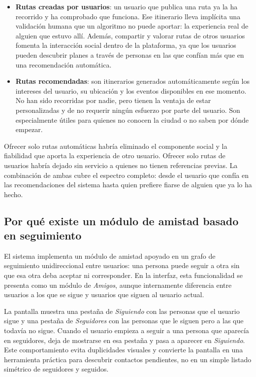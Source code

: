 \begin{itemize}
    \item \textbf{Rutas creadas por usuarios}: un usuario que publica una ruta ya la ha recorrido y ha comprobado que funciona. Ese itinerario lleva implícita una validación humana que un algoritmo no puede aportar: la experiencia real de alguien que estuvo allí. Además, compartir y valorar rutas de otros usuarios fomenta la interacción social dentro de la plataforma, ya que los usuarios pueden descubrir planes a través de personas en las que confían más que en una recomendación automática.
    \item \textbf{Rutas recomendadas}: son itinerarios generados automáticamente según los intereses del usuario, su ubicación y los eventos disponibles en ese momento. No han sido recorridas por nadie, pero tienen la ventaja de estar personalizadas y de no requerir ningún esfuerzo por parte del usuario. Son especialmente útiles para quienes no conocen la ciudad o no saben por dónde empezar.
\end{itemize}

Ofrecer solo rutas automáticas habría eliminado el componente social y la fiabilidad que aporta la experiencia de otro usuario. Ofrecer solo rutas de usuarios habría dejado sin servicio a quienes no tienen referencias previas. La combinación de ambas cubre el espectro completo: desde el usuario que confía en las recomendaciones del sistema hasta quien prefiere fiarse de alguien que ya lo ha hecho.

\subsection{Por qué existe un módulo de amistad basado en seguimiento}

El sistema implementa un módulo de amistad apoyado en un grafo de seguimiento unidireccional entre usuarios: una persona puede seguir a otra sin que esa otra deba aceptar ni corresponder. En la interfaz, esta funcionalidad se presenta como un módulo de \textit{Amigos}, aunque internamente diferencia entre usuarios a los que se sigue y usuarios que siguen al usuario actual.

La pantalla muestra una pestaña de \textit{Siguiendo} con las personas que el usuario sigue y una pestaña de \textit{Seguidores} con las personas que le siguen pero a las que todavía no sigue. Cuando el usuario empieza a seguir a una persona que aparecía en seguidores, deja de mostrarse en esa pestaña y pasa a aparecer en \textit{Siguiendo}. Este comportamiento evita duplicidades visuales y convierte la pantalla en una herramienta práctica para descubrir contactos pendientes, no en un simple listado simétrico de seguidores y seguidos.

